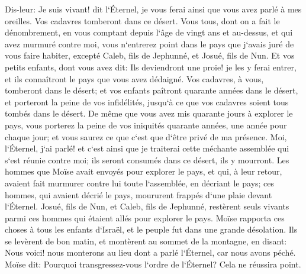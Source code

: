 \verse Dis-leur: Je suis vivant! dit l`Éternel, je vous ferai ainsi que vous avez parlé à mes oreilles. 
\verse Vos cadavres tomberont dans ce désert. Vous tous, dont on a fait le dénombrement, en vous comptant depuis l`âge de vingt ans et au-dessus, et qui avez murmuré contre moi, 
\verse vous n`entrerez point dans le pays que j`avais juré de vous faire habiter, excepté Caleb, fils de Jephunné, et Josué, fils de Nun. 
\verse Et vos petits enfants, dont vous avez dit: Ils deviendront une proie! je les y ferai entrer, et ils connaîtront le pays que vous avez dédaigné. 
\verse Vos cadavres, à vous, tomberont dans le désert; 
\verse et vos enfants paîtront quarante années dans le désert, et porteront la peine de vos infidélités, jusqu`à ce que vos cadavres soient tous tombés dans le désert. 
\verse De même que vous avez mis quarante jours à explorer le pays, vous porterez la peine de vos iniquités quarante années, une année pour chaque jour; et vous saurez ce que c`est que d`être privé de ma présence. 
\verse Moi, l`Éternel, j`ai parlé! et c`est ainsi que je traiterai cette méchante assemblée qui s`est réunie contre moi; ils seront consumés dans ce désert, ils y mourront. 
\verse Les hommes que Moïse avait envoyés pour explorer le pays, et qui, à leur retour, avaient fait murmurer contre lui toute l`assemblée, en décriant le pays; 
\verse ces hommes, qui avaient décrié le pays, moururent frappés d`une plaie devant l`Éternel. 
\verse Josué, fils de Nun, et Caleb, fils de Jephunné, restèrent seuls vivants parmi ces hommes qui étaient allés pour explorer le pays. 
\verse Moïse rapporta ces choses à tous les enfants d`Israël, et le peuple fut dans une grande désolation. 
\verse Ils se levèrent de bon matin, et montèrent au sommet de la montagne, en disant: Nous voici! nous monterons au lieu dont a parlé l`Éternel, car nous avons péché. 
\verse Moïse dit: Pourquoi transgressez-vous l`ordre de l`Éternel? Cela ne réussira point. 
